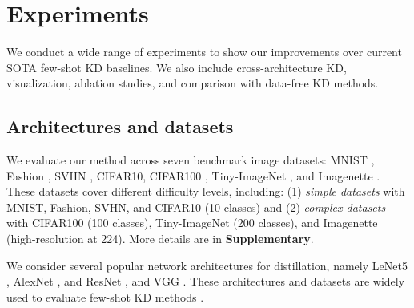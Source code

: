 \section{Experiments} \label{sec:34-research01-experiments}

\begin{foldable}
We conduct a wide range of experiments to show our improvements over current SOTA few-shot KD baselines.
We also include cross-architecture KD, visualization, ablation studies, and comparison with data-free KD methods.
\end{foldable}


\subsection{Architectures and datasets}
\begin{foldable}
We evaluate our method across seven benchmark image datasets: MNIST \cite{lecun1998gradient}, Fashion \cite{xiao2017fashion}, SVHN \cite{netzer2011reading}, CIFAR10, CIFAR100 \cite{krizhevsky2009learning}, Tiny-ImageNet \cite{le2015tiny}, and Imagenette \cite{howard2020imagenette}.
These datasets cover different difficulty levels, including: (1) \textit{simple datasets} with MNIST, Fashion, SVHN, and CIFAR10 (10 classes) and (2) \textit{complex datasets} with CIFAR100 (100 classes), Tiny-ImageNet (200 classes), and Imagenette (high-resolution at 224).
More details are in \textbf{Supplementary}.
\end{foldable}

\begin{foldable}
We consider several popular network architectures for distillation, namely LeNet5 \cite{lecun1998gradient}, AlexNet \cite{krizhevsky2012imagenet}, and ResNet \cite{he2016deep}, and VGG \cite{simonyan2014very}.
These architectures and datasets are widely used to evaluate few-shot KD methods \cite{kimura2018fewshot,wang2020neural,nguyen2022black}.
\end{foldable}


